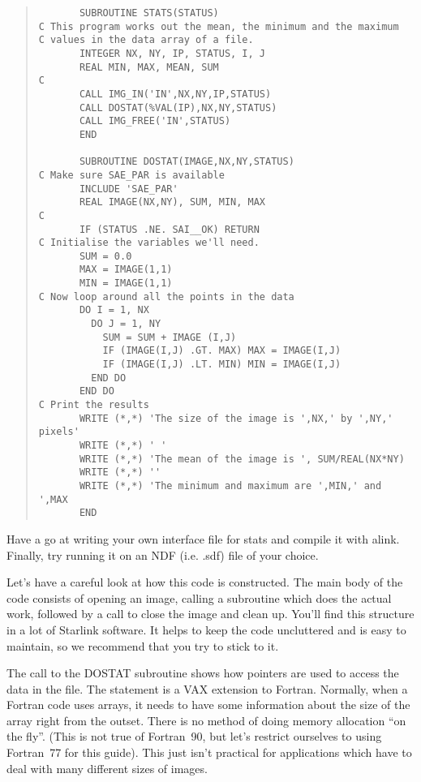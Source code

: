 \begin{quote}
{\small
\begin{verbatim}
       SUBROUTINE STATS(STATUS)
C This program works out the mean, the minimum and the maximum
C values in the data array of a file.
       INTEGER NX, NY, IP, STATUS, I, J
       REAL MIN, MAX, MEAN, SUM
C
       CALL IMG_IN('IN',NX,NY,IP,STATUS)
       CALL DOSTAT(%VAL(IP),NX,NY,STATUS)
       CALL IMG_FREE('IN',STATUS)
       END

       SUBROUTINE DOSTAT(IMAGE,NX,NY,STATUS)
C Make sure SAE_PAR is available
       INCLUDE 'SAE_PAR'
       REAL IMAGE(NX,NY), SUM, MIN, MAX
C
       IF (STATUS .NE. SAI__OK) RETURN
C Initialise the variables we'll need.
       SUM = 0.0
       MAX = IMAGE(1,1)
       MIN = IMAGE(1,1)
C Now loop around all the points in the data
       DO I = 1, NX
         DO J = 1, NY
           SUM = SUM + IMAGE (I,J)
           IF (IMAGE(I,J) .GT. MAX) MAX = IMAGE(I,J)
           IF (IMAGE(I,J) .LT. MIN) MIN = IMAGE(I,J)
         END DO
       END DO
C Print the results
       WRITE (*,*) 'The size of the image is ',NX,' by ',NY,' pixels'
       WRITE (*,*) ' '
       WRITE (*,*) 'The mean of the image is ', SUM/REAL(NX*NY)
       WRITE (*,*) ''
       WRITE (*,*) 'The minimum and maximum are ',MIN,' and ',MAX
       END
\end{verbatim}
}
\end{quote}

Have a go at writing your own interface file for {\sf stats} and
compile it with {\sf alink}. Finally, try running it on an
NDF (i.e. .sdf) file of your choice.

Let's have a careful look at how this code is constructed. The main body
of the code consists of opening an image, calling a subroutine which does the
actual work, followed by a call to close the image and clean up. You'll
find this structure in a lot of Starlink software. It helps to keep the
code uncluttered and is easy to maintain, so we recommend that
you try to stick to it.

The call to the {\sf DOSTAT} subroutine shows how pointers are used to
access the data in the file. The {} statement is a VAX
extension to Fortran.  Normally, when a Fortran code uses arrays, it needs
to have some information about the size of the array right from the outset.
There is no method of doing memory allocation ``on the fly''. (This is not
true of Fortran~90, but let's restrict ourselves to using Fortran~77 for
this guide). This just isn't practical for applications which have to deal
with many different sizes of images.

